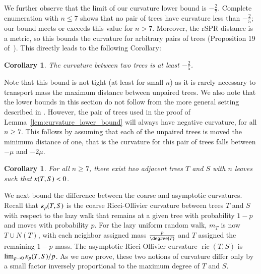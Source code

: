\documentclass[]{elsarticle}
\newtheorem{cor}[thm]{Corollary}
\newcommand{\curvature}[2][]{%
    \ifthenelse{\equal{#1}{}}%
		{\kappa(#2)}%
		{\kappa_{#1}(#2)}%
}
\newcommand{\ric}[1]{
	\operatorname{ric}(#1)%
}
\begin{document}
We further observe that the limit of our curvature lower bound is $-\frac{2}{7}$.
Complete enumeration with $n \le 7$ shows that no pair of trees have curvature less than $-\frac{2}{5}$; our bound meets or exceeds this value for $n > 7$.
Moreover, the rSPR distance is a metric, so this bounds the curvature for arbitrary pairs of trees (Proposition 19 of~\citep{Ollivier2009-bw}).
This directly leads to the following Corollary:

\begin{cor}
	The curvature between two trees is at least $-\frac{2}{5}$.
\end{cor}

Note that this bound is not tight (at least for small $n$) as it is rarely necessary to transport mass the maximum distance between unpaired trees.
We also note that the lower bounds in this section do not follow from the more general setting described in \citep{Jost2013-ce}.
However, the pair of trees used in the proof of Lemma~\ref{lem:curvature_lower_bound} will always have negative curvature, for all $n \ge 7$.
This follows by assuming that each of the unpaired trees is moved the minimum distance of one, that is the curvature for this pair of trees falls between $-\mu$ and $-2\mu$.

\begin{cor}
For all $n \ge 7$, there exist two adjacent trees $T$ and $S$ with $n$ leaves such that $\curvature{T,S} < 0$.
\end{cor}

We next bound the difference between the coarse and asymptotic curvatures.
Recall that $\curvature[p]{T,S}$ is the coarse Ricci-Ollivier curvature between trees $T$ and $S$ with respect to the lazy walk that remains at a given tree with probability $1-p$ and moves with probability $p$.
For the lazy uniform random walk, $m_T$ is now $T \cup N(T)$, with each neighbor assigned mass $\frac{p}{\degree{T}}$ and $T$ assigned the remaining $1 - p$ mass.
The asymptotic Ricci-Ollivier curvature $\ric{T,S}$ is $\lim_{p \rightarrow 0} \curvature[p]{T,S} / p$.
As we now prove, these two notions of curvature differ only by a small factor inversely proportional to the maximum degree of $T$ and $S$.
\end{document}
